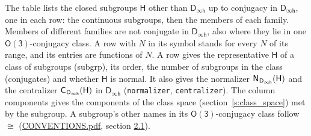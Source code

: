\documentclass[10pt,a4paper]{article}
\numberwithin{equation}{section}
\newcommand{\grp}[1]{\mathsf{#1}}
\newcommand{\samecls}{\cong}
\newcommand{\hairsp}{\mkern1mu}
\begin{document}
\leavevmode\label{n:group.H}The table lists the closed subgroups $\grp{H}$ other than $\grp{D_{\infty h}}$ up to conjugacy in $\grp{D_{\infty h}}$, one in each row: the continuous subgroups, then the members of each family. Members of different families are not conjugate in $\grp{D_{\infty h}}$, also where they lie in one \href{O3.pdf}{$\grp{O(3)}$}-conjugacy class. A row with $N$ in its symbol stands for every $N$ of its range, and its entries are functions of $N$. \label{n:head.subgroup}\label{n:head.order}\label{n:head.conjugates}\label{n:head.normal}A row gives the representative $\grp{H}$ of a class of subgroups (subgrp), its order, the number of subgroups in the class (conjugates) and whether $\grp{H}$ is normal. \label{n:group.normalizer}\label{n:group.centralizer}It also gives the normalizer $\grp{N}_{\hairsp \grp{D_{\infty h}}}(\grp{H})$ and the centralizer $\grp{C}_{\hairsp \grp{D_{\infty h}}}(\grp{H})$ in $\grp{D_{\infty h}}$ (\texttt{normalizer}, \texttt{centralizer}). \label{n:head.components}The column components gives the components of the class space (section~\ref{s:class_space}) met by the subgroup. A subgroup's other names in its \href{O3.pdf}{$\grp{O(3)}$}-conjugacy class follow $\samecls$ (\href{../../CONVENTIONS.pdf}{CONVENTIONS.pdf}, section \href{../../CONVENTIONS.pdf\#conv.2.1}{2.1}).
\end{document}
